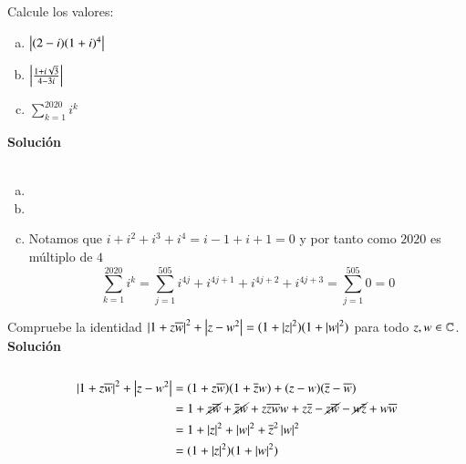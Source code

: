     \begin{ex}[H1.2]\label{ex:h1.2}
        Calcule los valores:
        \begin{enumerate}[a)]
            \item $\left|(2-i)(1+i)^4\right|$
            \item $\left|\frac{1+i\sqrt 3}{4-3i}\right|$
            \item $\sum_{k=1}^{2020} i^k$
        \end{enumerate}
        \textbf{Solución}\\\\
        \begin{enumerate}[a)]
            \item
            \item
            \item
            Notamos que $i + i^2 + i^3 + i^4 = i -1 +i +1 = 0$ y por tanto como $2020$ es múltiplo de $4$
            $$
                \sum_{k=1}^{2020} i^k = \sum_{j=1}^{505} i^{4j} + i^{4j+1} + i^{4j+2} + i^{4j+3} = \sum_{j=1}^{505} 0 = 0
            $$
        \end{enumerate}
    \end{ex}

    \begin{ex}[H1.3]
        Compruebe la identidad $\left|1+z\overline{w}\right|^2 + \left|z-w^2\right| = (1+\left|z\right|^2)(1+\left|w\right|^2)$ para todo $z, w \in \mathbb{C}$.\\

        \textbf{Solución}\\\\
        \begin{align*}
            \left|1+z\overline{w}\right|^2 + \left|z-w^2\right| &= (1+z\overline{w})(1+\overline{z} w) + (z-w)(\overline{z} - \overline{w})\\
            &= 1+ \cancel{z\overline{w}} + \cancel{\overline{z} w} + z\overline{z}\overline{w}w + z\overline{z} - \cancel{z\overline{w}} - \cancel{w\overline{z}} + w\overline{w} \\
            &= 1 + \left|z\right|^2 + \left|w\right|^2 + \overline{z}^2\left|w\right|^2\\
            &= (1+\left|z\right|^2)(1+\left|w\right|^2)
        \end{align*}
    \end{ex}

